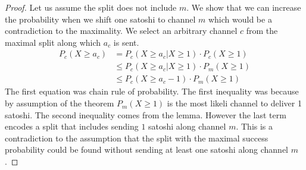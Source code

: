 \documentclass[10pt,twocolumn]{article}
\begin{document}
\begin{proof}
  Let us assume the split does not include $m$.
  We show that we can increase the probability when we shift one satoshi to channel $m$ which would be a contradiction to the maximality.
  We select an arbitrary channel $c$ from the maximal split along which $a_c$ is sent.
  \begin{equation*}
    \begin{aligned}
      P_c(X\geq a_c) & = P_c(X \geq a_c | X \geq 1)\cdot P_c(X\geq 1) \\
      & \leq P_c(X \geq a_c | X \geq 1)\cdot P_m(X\geq 1) \\
      & \leq P_c(X \geq a_c - 1 ) \cdot P_m(X\geq 1)
    \end{aligned}  
  \end{equation*}
  The first equation was chain rule of probability.
  The first inequality was because by assumption of the theorem $P_m(X\geq 1)$ is the most likeli channel to deliver 1 satoshi.
  The second inequality comes from the lemma.
  However the last term encodes a split that includes sending $1$ satoshi along channel $m$.
  This is a contradiction to the assumption that the split with the maximal success probability could be found without sending at least one satoshi along channel $m$.
\end{proof}
  
\end{document}
